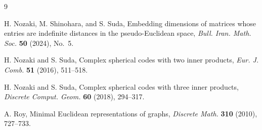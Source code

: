 \documentclass[a4paper, 11pt]{article}
\theoremstyle{definition}
\begin{document}
\begin{thebibliography}{9}

H. Nozaki, M. Shinohara, and S. Suda, 
Embedding dimensions of matrices whose entries are indefinite distances in the pseudo-Euclidean space,
{\it Bull. Iran. Math. Soc.} {\bf 50} (2024), No.\ 5. 

H. Nozaki and S. Suda, Complex spherical codes with two inner products, {\it Eur. J. Comb.} \textbf{51} (2016), 511--518.

H. Nozaki and S. Suda, Complex spherical codes with three inner products, {\it Discrete Comput. Geom.} \textbf{60} (2018), 294--317.




 A. Roy, 
Minimal Euclidean representations of graphs, 
{\it Discrete Math.} {\bf 310} (2010), 727--733.



\end{thebibliography}
\end{document}
